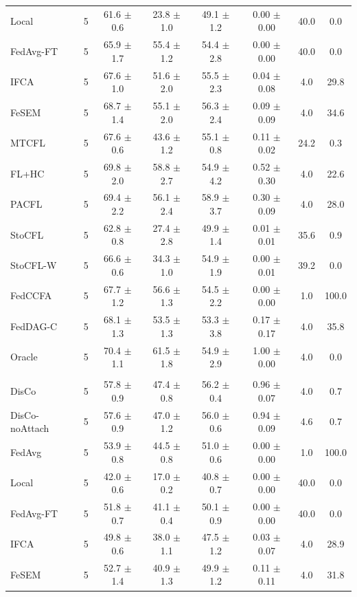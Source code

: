 {{\begin{tabular}{l r c c c c c c}
Local & 5 & 61.6 $\pm$ 0.6 & 23.8 $\pm$ 1.0 & 49.1 $\pm$ 1.2 & 0.00 $\pm$ 0.00 & 40.0 & 0.0 \\
FedAvg-FT & 5 & 65.9 $\pm$ 1.7 & 55.4 $\pm$ 1.2 & 54.4 $\pm$ 2.8 & 0.00 $\pm$ 0.00 & 40.0 & 0.0 \\
IFCA & 5 & 67.6 $\pm$ 1.0 & 51.6 $\pm$ 2.0 & 55.5 $\pm$ 2.3 & 0.04 $\pm$ 0.08 & 4.0 & 29.8 \\
FeSEM & 5 & 68.7 $\pm$ 1.4 & 55.1 $\pm$ 2.0 & 56.3 $\pm$ 2.4 & 0.09 $\pm$ 0.09 & 4.0 & 34.6 \\
MTCFL & 5 & 67.6 $\pm$ 0.6 & 43.6 $\pm$ 1.2 & 55.1 $\pm$ 0.8 & 0.11 $\pm$ 0.02 & 24.2 & 0.3 \\
FL+HC & 5 & 69.8 $\pm$ 2.0 & 58.8 $\pm$ 2.7 & 54.9 $\pm$ 4.2 & 0.52 $\pm$ 0.30 & 4.0 & 22.6 \\
PACFL & 5 & 69.4 $\pm$ 2.2 & 56.1 $\pm$ 2.4 & 58.9 $\pm$ 3.7 & 0.30 $\pm$ 0.09 & 4.0 & 28.0 \\
StoCFL & 5 & 62.8 $\pm$ 0.8 & 27.4 $\pm$ 2.8 & 49.9 $\pm$ 1.4 & 0.01 $\pm$ 0.01 & 35.6 & 0.9 \\
StoCFL-W & 5 & 66.6 $\pm$ 0.6 & 34.3 $\pm$ 1.0 & 54.9 $\pm$ 1.9 & 0.00 $\pm$ 0.01 & 39.2 & 0.0 \\
FedCCFA & 5 & 67.7 $\pm$ 1.2 & 56.6 $\pm$ 1.3 & 54.5 $\pm$ 2.2 & 0.00 $\pm$ 0.00 & 1.0 & 100.0 \\
FedDAG-C & 5 & 68.1 $\pm$ 1.3 & 53.5 $\pm$ 1.3 & 53.3 $\pm$ 3.8 & 0.17 $\pm$ 0.17 & 4.0 & 35.8 \\
Oracle & 5 & 70.4 $\pm$ 1.1 & 61.5 $\pm$ 1.8 & 54.9 $\pm$ 2.9 & 1.00 $\pm$ 0.00 & 4.0 & 0.0 \\
\addlinespace
\multicolumn{8}{l}{\textit{CIFAR-100 label swaps}} \\
DisCo & 5 & 57.8 $\pm$ 0.9 & 47.4 $\pm$ 0.8 & 56.2 $\pm$ 0.4 & 0.96 $\pm$ 0.07 & 4.0 & 0.7 \\
DisCo-noAttach & 5 & 57.6 $\pm$ 0.9 & 47.0 $\pm$ 1.2 & 56.0 $\pm$ 0.6 & 0.94 $\pm$ 0.09 & 4.6 & 0.7 \\
FedAvg & 5 & 53.9 $\pm$ 0.8 & 44.5 $\pm$ 0.8 & 51.0 $\pm$ 0.6 & 0.00 $\pm$ 0.00 & 1.0 & 100.0 \\
Local & 5 & 42.0 $\pm$ 0.6 & 17.0 $\pm$ 0.2 & 40.8 $\pm$ 0.7 & 0.00 $\pm$ 0.00 & 40.0 & 0.0 \\
FedAvg-FT & 5 & 51.8 $\pm$ 0.7 & 41.1 $\pm$ 0.4 & 50.1 $\pm$ 0.9 & 0.00 $\pm$ 0.00 & 40.0 & 0.0 \\
IFCA & 5 & 49.8 $\pm$ 0.6 & 38.0 $\pm$ 1.1 & 47.5 $\pm$ 1.2 & 0.03 $\pm$ 0.07 & 4.0 & 28.9 \\
FeSEM & 5 & 52.7 $\pm$ 1.4 & 40.9 $\pm$ 1.3 & 49.9 $\pm$ 1.2 & 0.11 $\pm$ 0.11 & 4.0 & 31.8 \\

\end{tabular}}}

